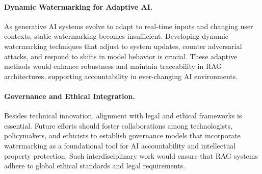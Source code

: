 \paragraph{Dynamic Watermarking for Adaptive AI.}
As generative AI systems evolve to adapt to real-time inputs and changing user contexts, static watermarking becomes insufficient. Developing dynamic watermarking techniques that adjust to system updates, counter adversarial attacks, and respond to shifts in model behavior is crucial. These adaptive methods would enhance robustness and maintain traceability in RAG architectures, supporting accountability in ever-changing AI environments.

\paragraph{Governance and Ethical Integration.}

Besides technical innovation, alignment with legal and ethical frameworks is essential. Future efforts should foster collaborations among technologists, policymakers, and ethicists to establish governance models that incorporate watermarking as a foundational tool for AI accountability and intellectual property protection. Such interdisciplinary work would ensure that RAG systems adhere to global ethical standards and legal requirements.